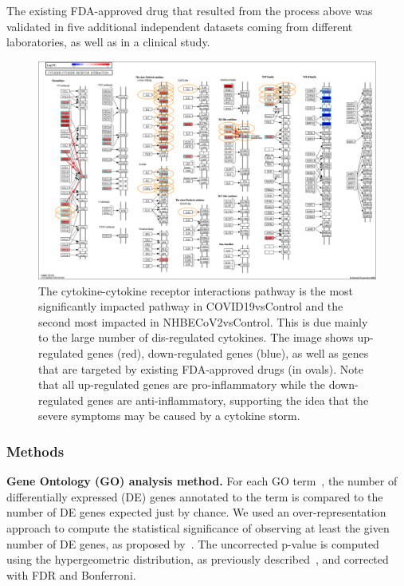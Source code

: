 \documentclass[Minh_PhD_thesis.tex]{subfiles}
\begin{document}
The existing FDA-approved drug that resulted from the process above was validated in five additional independent datasets coming from different laboratories, as well as in a clinical study.  

\begin{figure}
\centering
	\includegraphics[width=0.9\linewidth]{../Figures/Cytokine_cytokine_receptor_interaction_drugs.png}
    \caption{ The cytokine-cytokine receptor interactions pathway is the most significantly impacted pathway in COVID19vsControl and the second most impacted in NHBECoV2vsControl. This is due mainly to the large number of dis-regulated cytokines. The image shows up-regulated genes (red), down-regulated genes (blue), as well as  genes 
    that are targeted by existing FDA-approved drugs (in ovals). Note that all up-regulated genes are pro-inflammatory while the down-regulated genes are anti-inflammatory, supporting the idea that the severe symptoms may be caused by a cytokine storm.}
        \label{Supp:cytokine-cytokine_pathway}
\end{figure}


\subsubsection{Methods}
\textbf{Gene Ontology (GO) analysis method.}  For each GO term~\cite{ashburner2002ontologies, gene2004gene}, the number of differentially expressed (DE) genes annotated to the term is compared to the number of DE genes expected just by chance. We used  an over-representation approach to compute the statistical significance of observing at least the given number of DE genes, as proposed by~\cite{Tavazoie:1999}. The uncorrected p-value is computed using the hypergeometric distribution, as previously described~\cite{DraghiciOE2:2003, DraghiciBook:2011}, and corrected with FDR and Bonferroni.
\end{document}
